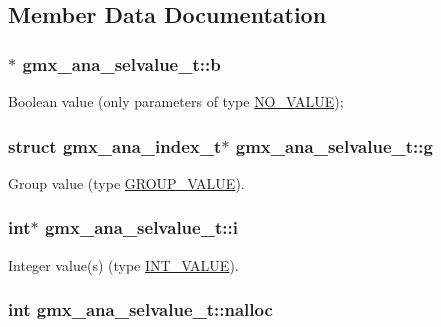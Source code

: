 \subsection{\-Member \-Data \-Documentation}
\hypertarget{structgmx__ana__selvalue__t_a040d77c026d33b7da43871c37c92eebb}{
\subsubsection[{b}]{$\ast$ {\bf gmx\-\_\-ana\-\_\-selvalue\-\_\-t\-::b}}}\label{structgmx__ana__selvalue__t_a040d77c026d33b7da43871c37c92eebb}
\-Boolean value (only parameters of type \hyperlink{share_2template_2gromacs_2selvalue_8h_a70b42b87d434580bf1493591857b8beca4d694119ce83b62d74ff06b5e017dca8}{\-N\-O\-\_\-\-V\-A\-L\-U\-E}); \hypertarget{structgmx__ana__selvalue__t_aecb3187d4996ff0548a69f97e258aecb}{
\subsubsection[{g}]{\setlength{\rightskip}{0pt plus 5cm}struct {\bf gmx\-\_\-ana\-\_\-index\-\_\-t}$\ast$ {\bf gmx\-\_\-ana\-\_\-selvalue\-\_\-t\-::g}}}\label{structgmx__ana__selvalue__t_aecb3187d4996ff0548a69f97e258aecb}
\-Group value (type \hyperlink{share_2template_2gromacs_2selvalue_8h_a70b42b87d434580bf1493591857b8beca70a2af6eafa48adfab506ceee60471f6}{\-G\-R\-O\-U\-P\-\_\-\-V\-A\-L\-U\-E}). \hypertarget{structgmx__ana__selvalue__t_af72b5764d0dbc8bc2c4479cc6f4c8148}{
\subsubsection[{i}]{\setlength{\rightskip}{0pt plus 5cm}int$\ast$ {\bf gmx\-\_\-ana\-\_\-selvalue\-\_\-t\-::i}}}\label{structgmx__ana__selvalue__t_af72b5764d0dbc8bc2c4479cc6f4c8148}
\-Integer value(s) (type \hyperlink{share_2template_2gromacs_2selvalue_8h_a70b42b87d434580bf1493591857b8becacd1ce0b084595a6072a57781dc7738a0}{\-I\-N\-T\-\_\-\-V\-A\-L\-U\-E}). \hypertarget{structgmx__ana__selvalue__t_a7f0a3a02a38a85dfc48611d126779a23}{
\subsubsection[{nalloc}]{\setlength{\rightskip}{0pt plus 5cm}int {\bf gmx\-\_\-ana\-\_\-selvalue\-\_\-t\-::nalloc}}}\label{structgmx__ana__selvalue__t_a7f0a3a02a38a85dfc48611d126779a23}


